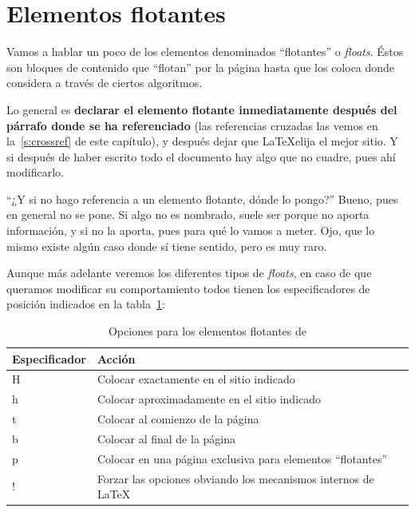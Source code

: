 \section{Elementos flotantes}

Vamos a hablar un poco de los elementos denominados \enquote{flotantes} o \textit{floats}. Éstos son bloques de contenido que \enquote{flotan} por la página hasta que  los coloca donde considera a través de ciertos algoritmos.

Lo general es \textbf{declarar el elemento flotante inmediatamente después del párrafo donde se ha referenciado} (las referencias cruzadas las vemos en la~\autoref{s:crossref} de este capítulo), y después dejar que \LaTeX\space elija el mejor sitio. Y si después de haber escrito todo el documento hay algo que no cuadre, pues ahí modificarlo.

\enquote{¿Y si no hago referencia a un elemento flotante, dónde lo pongo?} Bueno, pues en general no se pone. Si algo no es nombrado, suele ser porque no aporta información, y si no la aporta, pues para qué lo vamos a meter. Ojo, que lo mismo existe algún caso donde sí tiene sentido, pero es muy raro.

Aunque más adelante veremos los diferentes tipos de \textit{floats}, en caso de que queramos modificar su comportamiento todos tienen los especificadores de posición indicados en la tabla~\ref{tab:floats-options}:

\begin{table}
    \caption{\label{tab:floats-options}Opciones para los elementos flotantes de }
    \centering
    \begin{tabularx}{\textwidth}{@{}lX@{}}
        \toprule
        \textbf{Especificador} & \textbf{Acción} \\
        \midrule
        H & Colocar exactamente en el sitio indicado                       \\
        h & Colocar aproximadamente en el sitio indicado                   \\
        t & Colocar al comienzo de la página                               \\
        b & Colocar al final de la página                                  \\
        p & Colocar en una página exclusiva para elementos ``flotantes''   \\
        ! & Forzar las opciones obviando los mecanismos internos de \LaTeX \\
    \bottomrule
    \end{tabularx}
\end{table}

